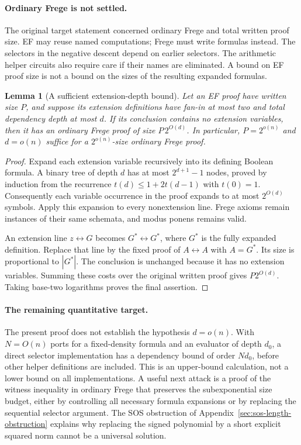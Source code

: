 \documentclass[11pt]{article}
\newtheorem{lemma}[theorem]{Lemma}
\theoremstyle{definition}
\theoremstyle{remark}
\begin{document}
\paragraph{Ordinary Frege is not settled.}
The original target statement concerned ordinary Frege and
total written proof size. EF may reuse named computations; Frege
must write formulas instead. The selectors in the negative
descent depend on earlier selectors. The arithmetic helper
circuits also require care if their names are eliminated.
A bound on EF proof size is not a bound on the sizes of the
resulting expanded formulas.

\begin{lemma}[A sufficient extension-depth bound]
\label{lem:extension-depth-transfer}
Let an EF proof have written size $P$, and suppose its extension
definitions have fan-in at most two and total dependency depth
at most $d$. If its conclusion contains no extension variables,
then it has an ordinary Frege proof of size $P\,2^{O(d)}$.
In particular, $P=2^{o(n)}$ and $d=o(n)$ suffice for a
$2^{o(n)}$-size ordinary Frege proof.
\end{lemma}
\begin{proof}
Expand each extension variable recursively into its defining
Boolean formula. A binary tree of depth $d$ has at most
$2^{d+1}-1$ nodes, proved by induction from the recurrence
$t(d)\le1+2t(d-1)$ with $t(0)=1$.
Consequently each variable occurrence in the proof expands to
at most $2^{O(d)}$ symbols. Apply this expansion to every
nonextension line. Frege axioms remain instances of their same
schemata, and modus ponens remains valid.

An extension line $z\leftrightarrow G$ becomes
$G^*\leftrightarrow G^*$, where $G^*$ is the fully expanded
definition. Replace that line by the fixed proof of
$A\leftrightarrow A$ with $A=G^*$. Its size is proportional
to $|G^*|$. The conclusion is unchanged because it has no
extension variables. Summing these costs over the original
written proof gives $P2^{O(d)}$. Taking base-two logarithms
proves the final assertion.
\end{proof}

\paragraph{The remaining quantitative target.}
The present proof does not establish the hypothesis $d=o(n)$.
With $N=O(n)$ ports for a fixed-density formula and an evaluator
of depth $d_0$, a direct selector implementation has a dependency
bound of order $N d_0$, before other helper definitions are
included. This is an upper-bound calculation, not a lower bound
on all implementations. A useful next attack is a proof of the
witness inequality in ordinary Frege that preserves the
subexponential size budget, either by controlling all necessary
formula expansions or by replacing the sequential selector
argument. The SOS obstruction of
Appendix~\ref{sec:sos-length-obstruction} explains why replacing the
signed polynomial by a short explicit squared norm cannot be
a universal solution.
\end{document}
